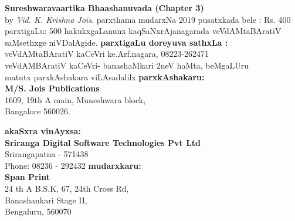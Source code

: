 \thispagestyle{empty}
\begin{flushleft}
{\rm{\textbf{Sureshwaravaartika Bhaashanuvada (Chapter 3)}\\by \textit{Vid. K. Krishna Jois.}}}
\vfill
parxthama mudarxNa {\rm {2019}}
\vfill
pusatxkada bele : {\rm {Rs. 400}}\\
parxtigaLu: {\rm {500}}
\vfill
hakukxgaLanunx kaqSaNxrAjanagarada veVdAMtaBAratiV saMsethxge niVDalAgide. 
\vfill
\textbf{parxtigaLu doreyuva sathxLa :}\\
veVdAMtaBAratiV kaCeVri ke.Arf.nagara, {\rm 08223-262471}\\
veVdAMBAratiV kaCeVri- banashaMkari 2neV haMta, beMgaLUru\\
matutx parxkAshakara viLAsadalilx
\vfill
\textbf{parxkAshakaru:}\\
{\rm {\textbf{M/S. Jois Publications} \\
1609, 19th A main, Muneshwara block,\\
Bangalore 560026.}}

\vfill
\textbf{akaSxra vinAyxsa:}\\ {\rm{\textbf{Sriranga Digital Software Technologies Pvt Ltd}\\ Srirangapatna - 571438\\ Phone: 08236 - 292432}}
\vfill
\textbf{mudarxkaru:}\\ {\rm{\textbf{Span Print}\\ 24 th A B.S.K, 67, 24th Cross Rd,\\ Banashankari Stage II,\\ Bengaluru, 560070}}

\end{flushleft}
